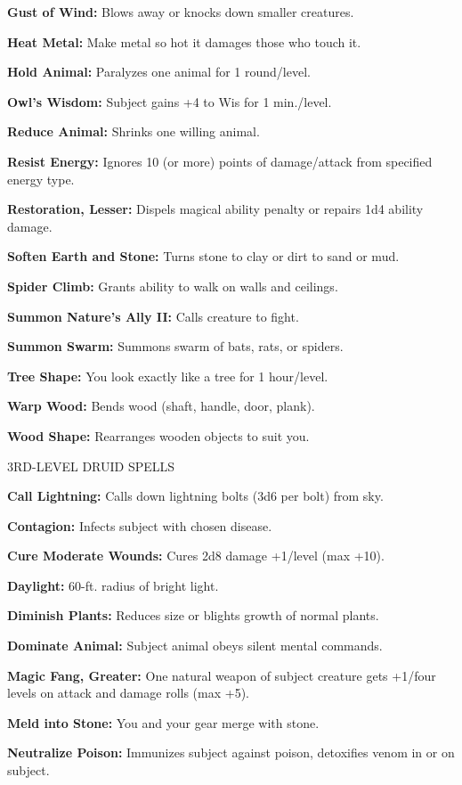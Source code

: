 \documentclass{article}
\begin{document}
\textbf{Gust of Wind:} Blows away or knocks down smaller creatures.

\textbf{Heat Metal:} Make metal so hot it damages those who touch it.

\textbf{Hold Animal:} Paralyzes one animal for 1 round/level.

\textbf{Owl's Wisdom:} Subject gains +4 to Wis for 1 min./level.

\textbf{Reduce Animal:} Shrinks one willing animal.

\textbf{Resist Energy:} Ignores 10 (or more) points of damage/attack from specified 
energy type.

\textbf{Restoration, Lesser:} Dispels magical ability penalty or repairs 1d4 ability 
damage.

\textbf{Soften Earth and Stone:} Turns stone to clay or dirt to sand or mud.

\textbf{Spider Climb:} Grants ability to walk on walls and ceilings.

\textbf{Summon Nature's Ally II:} Calls creature to fight.

\textbf{Summon Swarm:} Summons swarm of bats, rats, or spiders.

\textbf{Tree Shape:} You look exactly like a tree for 1 hour/level.

\textbf{Warp Wood:} Bends wood (shaft, handle, door, plank).

\textbf{Wood Shape:} Rearranges wooden objects to suit you.

3RD-LEVEL DRUID SPELLS

\textbf{Call Lightning:} Calls down lightning bolts (3d6 per bolt) from sky.

\textbf{Contagion:} Infects subject with chosen disease.

\textbf{Cure Moderate Wounds:} Cures 2d8 damage +1/level (max +10).

\textbf{Daylight:} 60-ft. radius of bright light.

\textbf{Diminish Plants:} Reduces size or blights growth of normal plants.

\textbf{Dominate Animal:} Subject animal obeys silent mental commands.

\textbf{Magic Fang, Greater:} One natural weapon of subject creature gets +1/four 
levels on attack and damage rolls (max +5).

\textbf{Meld into Stone:} You and your gear merge with stone.

\textbf{Neutralize Poison:} Immunizes subject against poison, detoxifies venom 
in or on subject.
\end{document}
